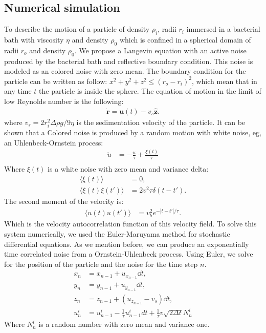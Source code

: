 \documentclass[%
10pt,
superscriptaddress,
twocolumn,
 amsmath,amssymb,
 aps,prx,
]{revtex4-2}
\begin{document}
\subsection{Numerical simulation}
 To describe the motion of a particle of density $\rho_i$, radii $r_i$ immersed in a bacterial bath with viscosity $\eta$ and density $\rho_0$ which is confined in a spherical domain of radii $r_o$ and density $\rho_0$.
 We propose a Langevin equation with an active noise produced by the bacterial bath and reflective boundary condition. 
 This noise is modeled as an colored noise with zero mean.
 The boundary condition for the particle can be written as follow: $x^2+y^2+z^2\leq (r_o-r_i)^2$, which mean that in any time $t$ the particle is inside the sphere.  
The equation of motion in the limit of low Reynolds number is the following:
\begin{align}
  \label{eq.Langevin_num}
  \mathbf{\dot{r}}=\mathbf{u}(t)-v_s\mathbf{\hat{z}}.
\end{align}
where  $v_s=2 r_i^2 \Delta\rho g/9\eta$ is the sedimentation velocity of the particle.
It can be shown that a Colored noise  is produced by a random motion with white noise, eg, an Uhlenbeck-Ornstein process:
\begin{align}
    \label{OUP}
  \dot{u}&=-\frac{u}{\tau}+\frac{\xi(t)}{\tau}\\
\end{align}
Where $\xi(t)$ is a white noise with zero mean and variance delta:
\begin{align}
  \langle \xi(t)\rangle &=0,\\
  \langle \xi(t)\xi(t')\rangle &=2v^2\tau\delta(t-t').
\end{align}
The second moment of the velocity is:
\begin{align}
  \langle u(t)u(t')\rangle &=v_b^2e^{-|t-t'|/\tau}. 
\end{align}
Which is the velocity autocorrelation function of this velocity field.
To solve this system numerically, we used the Euler-Maruyama method for stochastic differential equations.
As we mention before, we can produce an exponentially time correlated noise from a Ornstein-Uhlenbeck process.
Using Euler, we solve for the position of the particle and the noise for the time step $n$.
\begin{align}
   \label{eq:Euler_method}
   x_n&=x_{n-1}+u_{x_{n-1}}\dd t,\\
   y_n&=y_{n-1}+u_{y_{n-1}}\dd t,\\
   z_n&=z_{n-1}+(u_{z_{n-1}}-v_s)\dd t,\\
   u^i_{n}&=u^i_{n-1}-\frac{1}{\tau}u^i_{n-1}dt+\frac{1}{\tau}v\sqrt{2\Delta t}N^i_{n}
\end{align}
Where $N^{i}_n$ is a random number with zero mean and variance one.
\end{document}

